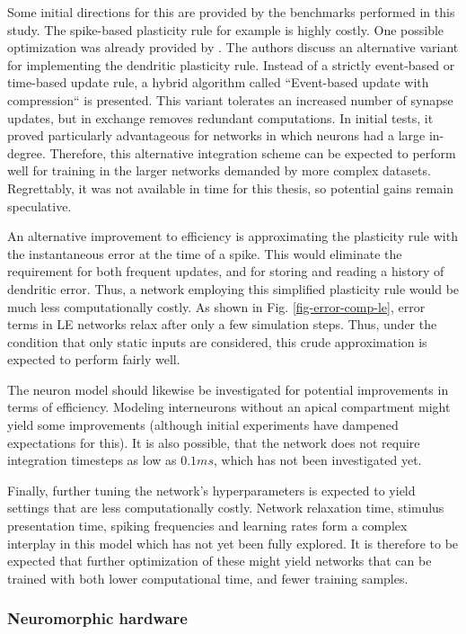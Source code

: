 Some initial directions for this are provided by the benchmarks performed in this study. The spike-based plasticity rule
for example is highly costly. One possible optimization was already provided by \citep{Stapmanns2021}. The authors
discuss an alternative variant for implementing the dendritic plasticity rule. Instead of a strictly event-based or
time-based update rule, a hybrid algorithm called ``Event-based update with compression`` is presented. This variant
tolerates an increased number of synapse updates, but in exchange removes redundant computations. In initial tests, it
proved particularly advantageous for networks in which neurons had a large in-degree. Therefore, this alternative
integration scheme can be expected to perform well for training in the larger networks demanded by more complex
datasets. Regrettably, it was not available in time for this thesis, so potential gains remain speculative.

An alternative improvement to efficiency is approximating the plasticity rule with the instantaneous error at the time
of a spike. This would eliminate the requirement for both frequent updates, and for storing and reading a history of
dendritic error. Thus, a network employing this simplified plasticity rule would be much less computationally costly. As
shown in Fig. \ref{fig-error-comp-le}, error terms in LE networks relax after only a few simulation steps. Thus,
under the condition that only static inputs are considered, this crude approximation is expected to perform fairly well.

The neuron model should likewise be investigated for potential improvements in terms of efficiency. Modeling
interneurons without an apical compartment might yield some improvements (although initial experiments have dampened
expectations for this). It is also possible, that the network does not require integration timesteps as low as $0.1ms$,
which has not been investigated yet.

Finally, further tuning the network's hyperparameters is expected to yield settings that are less computationally
costly. Network relaxation time, stimulus presentation time, spiking frequencies and learning rates form a complex
interplay in this model which has not yet been fully explored. It is therefore to be expected that further optimization
of these might yield networks that can be trained with both lower computational time, and fewer training samples.


\subsubsection*{Neuromorphic hardware}

